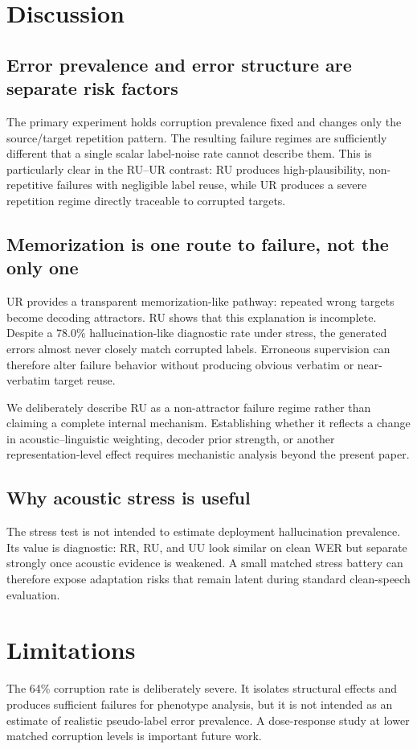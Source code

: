 \documentclass[conference]{IEEEtran}
\begin{document}
\section{Discussion}
\subsection{Error prevalence and error structure are separate risk factors}
The primary experiment holds corruption prevalence fixed and changes only the
source/target repetition pattern. The resulting failure regimes are sufficiently
different that a single scalar label-noise rate cannot describe them. This is
particularly clear in the RU--UR contrast: RU produces high-plausibility,
non-repetitive failures with negligible label reuse, while UR produces a severe
repetition regime directly traceable to corrupted targets.

\subsection{Memorization is one route to failure, not the only one}
UR provides a transparent memorization-like pathway: repeated wrong targets
become decoding attractors. RU shows that this explanation is incomplete.
Despite a 78.0\% hallucination-like diagnostic rate under stress, the generated
errors almost never closely match corrupted labels. Erroneous supervision can
therefore alter failure behavior without producing obvious verbatim or
near-verbatim target reuse.

We deliberately describe RU as a non-attractor failure regime rather than
claiming a complete internal mechanism. Establishing whether it reflects a
change in acoustic--linguistic weighting, decoder prior strength, or another
representation-level effect requires mechanistic analysis beyond the present
paper.

\subsection{Why acoustic stress is useful}
The stress test is not intended to estimate deployment hallucination prevalence.
Its value is diagnostic: RR, RU, and UU look similar on clean WER but separate
strongly once acoustic evidence is weakened. A small matched stress battery can
therefore expose adaptation risks that remain latent during standard clean-speech
evaluation.

\section{Limitations}
The 64\% corruption rate is deliberately severe. It isolates structural effects
and produces sufficient failures for phenotype analysis, but it is not intended
as an estimate of realistic pseudo-label error prevalence. A dose-response study
at lower matched corruption levels is important future work.
\end{document}
